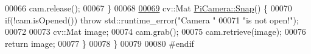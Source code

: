 \begin{DoxyCode}
00066         cam.release();
00067     \}
00068 
\hypertarget{PiCamera_8hpp_source_l00069}{}\hyperlink{classChipChipArray_1_1PiCamera_a58fb0de02570dce9a9cb60a1a04fb84f}{00069}     cv::Mat \hyperlink{classChipChipArray_1_1PiCamera_a58fb0de02570dce9a9cb60a1a04fb84f}{PiCamera::Snap}() \{
00070         \textcolor{keywordflow}{if}(!cam.isOpened()) \textcolor{keywordflow}{throw} std::runtime\_error(\textcolor{stringliteral}{"Camera "}
00071                 \textcolor{stringliteral}{"is not open!"});
00072 
00073         cv::Mat image;
00074         cam.grab();
00075         cam.retrieve(image);
00076         \textcolor{keywordflow}{return} image;
00077     \}
00078 \}
00079 
00080 \textcolor{preprocessor}{#endif}
\end{DoxyCode}

